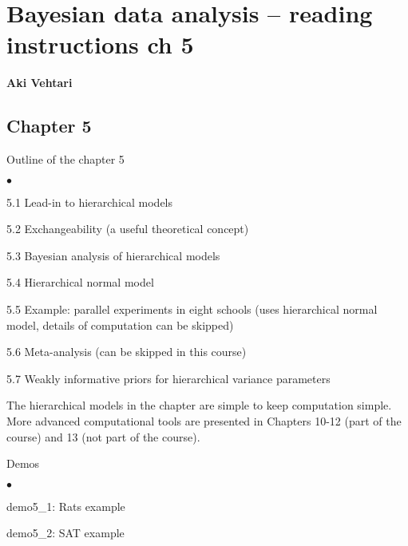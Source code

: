 \documentclass[a4paper,11pt,english]{article}
\begin{document}
\thispagestyle{empty}

\section*{Bayesian data analysis -- reading instructions ch 5} 
\smallskip
{\bf Aki Vehtari}
\smallskip

\subsection*{Chapter 5}

Outline of the chapter 5
\begin{list}{$\bullet$}{\parsep=0pt\itemsep=2pt}
\item 5.1 Lead-in to hierarchical models
\item 5.2 Exchangeability (a useful theoretical concept)
\item 5.3 Bayesian analysis of hierarchical models
\item 5.4 Hierarchical normal model
\item 5.5 Example: parallel experiments in eight schools (uses hierarchical normal model, details of computation can be skipped)
\item 5.6 Meta-analysis (can be skipped in this course)
\item 5.7 Weakly informative priors for hierarchical variance parameters
\end{list}

The hierarchical models in the chapter are simple to keep computation
simple. More advanced computational tools are presented in Chapters
10-12 (part of the course) and 13 (not part of the course).

Demos
\begin{list}{$\bullet$}{\parsep=0pt\itemsep=2pt}
\item demo5\_1: Rats example
\item demo5\_2: SAT example
\end{list}
\end{document}
